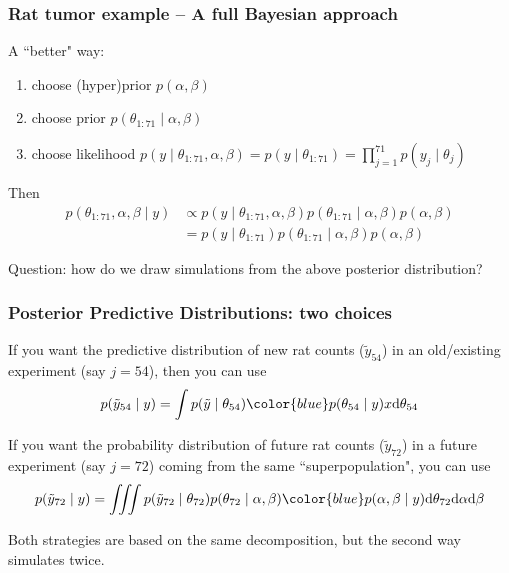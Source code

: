 \documentclass{beamer}
\begin{document}
\begin{frame}
\frametitle{Rat tumor example -- A full Bayesian approach}

A ``better" way:
\begin{enumerate}
\item choose (hyper)prior $p(\alpha,\beta)$ 
\item choose prior $p(\theta_{1:71} \mid \alpha, \beta)$
\item choose likelihood $p(y \mid \theta_{1:71}, \alpha, \beta) = p(y \mid \theta_{1:71}) = \prod_{j=1}^{71}p(y_j \mid \theta_{j})$
\end{enumerate}

Then 
\begin{align*}
p(\theta_{1:71}, \alpha, \beta \mid y) &\propto p(y \mid \theta_{1:71}, \alpha, \beta)p(\theta_{1:71} \mid \alpha,\beta)p(\alpha,\beta) \tag{Bayes'} \\
&= p(y \mid \theta_{1:71} )p(\theta_{1:71} \mid \alpha, \beta)p(\alpha,\beta) \tag{condtl. indep.} 
\end{align*}

Question: how do we draw simulations from the above posterior distribution?
\end{frame}

\begin{frame}
\frametitle{Posterior Predictive Distributions: two choices}

If you want the predictive distribution of new rat counts ($\tilde{y}_{54}$) in an old/existing experiment (say $j=54$), then you can use
\[
p(\tilde{y}_{54} \mid y) = \int p(\tilde{y} \mid \theta_{54})
{\color{blue} p(\theta_{54} \mid y)}x \text{d}\theta_{54}
\]

If you want the probability distribution of future rat counts ($\tilde{y}_{72}$) in a future experiment (say $j=72$) coming from the same ``superpopulation", you can use
\[
p(\tilde{y}_{72} \mid y) = \iiint p(\tilde{y}_{72} \mid
\theta_{72})p(\theta_{72} \mid \alpha, \beta) {\color{blue} p(\alpha,\beta \mid y)} \text{d}\theta_{72}\text{d}\alpha \text{d}\beta
\]

Both strategies are based on the same decomposition, but the second way simulates twice.
\end{frame}
\end{document}
